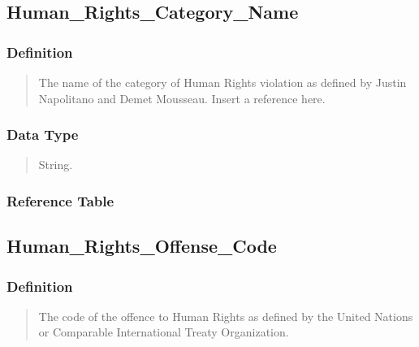 \documentclass[letterpaper,10pt,english]{sphinxmanual}
\begin{document}
\subsection{Human\_Rights\_Category\_Name}
\label{\detokenize{schema_tables:human-rights-category-name}}

\subsubsection{Definition}
\label{\detokenize{schema_tables:id70}}\begin{quote}

\sphinxAtStartPar
The name of the category of Human Rights violation as defined by Justin Napolitano and Demet Mousseau. Insert a reference here.
\end{quote}


\subsubsection{Data Type}
\label{\detokenize{schema_tables:id71}}\begin{quote}

\sphinxAtStartPar
String.
\end{quote}


\subsubsection{Reference Table}
\label{\detokenize{schema_tables:id72}}\begin{quote}

\sphinxAtStartPar
{\hyperref[\detokenize{schema_tables:human-rights-category-table}]{}}
\end{quote}


\subsection{Human\_Rights\_Offense\_Code}
\label{\detokenize{schema_tables:human-rights-offense-code}}

\subsubsection{Definition}
\label{\detokenize{schema_tables:id73}}\begin{quote}

\sphinxAtStartPar
The code of the offence to Human Rights as defined by the United Nations or Comparable International Treaty Organization.
\end{quote}
\end{document}
